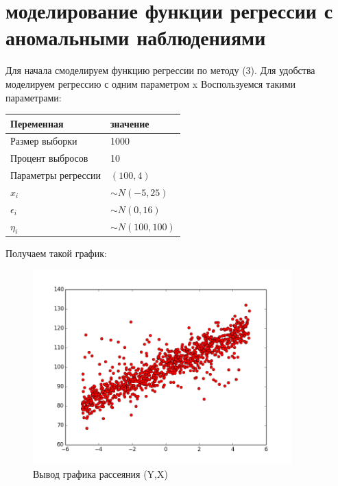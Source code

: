 \documentclass[12pt]{article}
\begin{document}
\section{моделирование функции регрессии с аномальными наблюдениями}
Для начала смоделируем функцию регрессии по методу (3). Для удобства моделируем регрессию с одним параметром x\hfill\break
Воспользуемся такими параметрами:\hfill\break
\begin{center}
\begin{tabular}{|p{5cm}|p{5cm}|}
    \hline
    Переменная&значение\\
    \hline
    Размер выборки & 1000\\
    \hline
    Процент выбросов & 10\\
    \hline
    Параметры регрессии & $(100,4)$\\
    \hline
    $x_i$ & $\sim N(-5,25)$\\
    \hline
    $\epsilon_i$&$\sim N(0,16)$\\
    \hline
    $\eta_i$&$\sim N(100,100)$\\
    \hline
\end{tabular}
\end{center}
Получаем такой график:\hfill\break
\begin{figure}[ht!]
    \centering
    \includegraphics[width=100mm]{graphic.png}
    \caption{Вывод графика рассеяния (Y,X)\label{overflow}}
\end{figure}
\end{document}
